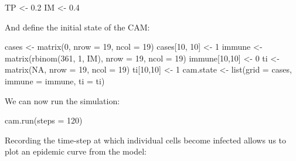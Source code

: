 \documentclass[
  12pt,
  a4paper]{book}
\newenvironment{Shaded}{\begin{snugshade}}{\end{snugshade}}
\newcommand{\AttributeTok}[1]{\textcolor[rgb]{0.77,0.63,0.00}{#1}}
\newcommand{\ConstantTok}[1]{\textcolor[rgb]{0.00,0.00,0.00}{#1}}
\newcommand{\DecValTok}[1]{\textcolor[rgb]{0.00,0.00,0.81}{#1}}
\newcommand{\FloatTok}[1]{\textcolor[rgb]{0.00,0.00,0.81}{#1}}
\newcommand{\FunctionTok}[1]{\textcolor[rgb]{0.00,0.00,0.00}{#1}}
\newcommand{\NormalTok}[1]{#1}
\newcommand{\OtherTok}[1]{\textcolor[rgb]{0.56,0.35,0.01}{#1}}
\newcommand{\SpecialCharTok}[1]{\textcolor[rgb]{0.00,0.00,0.00}{#1}}
\begin{document}
\begin{Shaded}
\begin{Highlighting}[]
\NormalTok{TP }\OtherTok{\textless{}{-}} \FloatTok{0.2}
\NormalTok{IM }\OtherTok{\textless{}{-}} \FloatTok{0.4}
\end{Highlighting}
\end{Shaded}

And define the initial state of the CAM:

\begin{Shaded}
\begin{Highlighting}[]
\NormalTok{cases }\OtherTok{\textless{}{-}} \FunctionTok{matrix}\NormalTok{(}\DecValTok{0}\NormalTok{, }\AttributeTok{nrow =} \DecValTok{19}\NormalTok{, }\AttributeTok{ncol =} \DecValTok{19}\NormalTok{)}
\NormalTok{cases[}\DecValTok{10}\NormalTok{, }\DecValTok{10}\NormalTok{] }\OtherTok{\textless{}{-}} \DecValTok{1}
\NormalTok{immune }\OtherTok{\textless{}{-}} \FunctionTok{matrix}\NormalTok{(}\FunctionTok{rbinom}\NormalTok{(}\DecValTok{361}\NormalTok{, }\DecValTok{1}\NormalTok{, IM), }\AttributeTok{nrow =} \DecValTok{19}\NormalTok{, }\AttributeTok{ncol =} \DecValTok{19}\NormalTok{)}
\NormalTok{immune[}\DecValTok{10}\NormalTok{,}\DecValTok{10}\NormalTok{] }\OtherTok{\textless{}{-}} \DecValTok{0}
\NormalTok{ti }\OtherTok{\textless{}{-}} \FunctionTok{matrix}\NormalTok{(}\ConstantTok{NA}\NormalTok{, }\AttributeTok{nrow =} \DecValTok{19}\NormalTok{, }\AttributeTok{ncol =} \DecValTok{19}\NormalTok{)}
\NormalTok{ti[}\DecValTok{10}\NormalTok{,}\DecValTok{10}\NormalTok{] }\OtherTok{\textless{}{-}} \DecValTok{1}
\NormalTok{cam.state }\OtherTok{\textless{}{-}} \FunctionTok{list}\NormalTok{(}\AttributeTok{grid =}\NormalTok{ cases, }\AttributeTok{immune =}\NormalTok{ immune, }\AttributeTok{ti =}\NormalTok{ ti)}
\end{Highlighting}
\end{Shaded}

We can now run the simulation:

\begin{Shaded}
\begin{Highlighting}[]
\FunctionTok{cam.run}\NormalTok{(}\AttributeTok{steps =} \DecValTok{120}\NormalTok{)}
\end{Highlighting}
\end{Shaded}

Recording the time-step at which individual cells become infected allows us to plot an epidemic curve from the model:

\begin{Shaded}
\end{Shaded}
\end{document}
